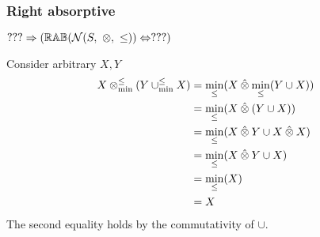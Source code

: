 \documentclass[../Summary.tex]{subfiles}
\begin{document}
\subsubsection{Right absorptive}

$??? \Rightarrow ({\mathbb{RAB}}(\mathcal{N}(S,\ \otimes,\ \leq)) \Leftrightarrow ???)$

\proof

Consider arbitrary $X, Y$
\begin{align*}
X \mathbin{\otimes_{\min}^{\leq}} (Y \mathbin{\cup_{\min}^{\leq}} X) 	& = \min_\leq(X \mathbin{\hat{\otimes}} \min_\leq(Y \cup X)) \\
							& = \min_\leq(X \mathbin{\hat{\otimes}} (Y \cup X)) \\
							& = \min_\leq(X \mathbin{\hat{\otimes}} Y \cup X \mathbin{\hat{\otimes}} X) \\
							& = \min_\leq(X \mathbin{\hat{\otimes}} Y \cup X) \\
							& = \min_\leq(X) \\
							& = X \\
\end{align*}
The second equality holds by the commutativity of $\cup$.
\end{document}
